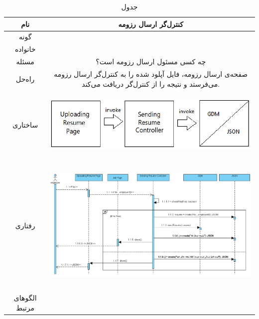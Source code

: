 \begin{table}[H]
	\begin{adjustbox}{width=\textwidth}
		\begin{tabular}{|c|c|}
			\hline
			نام &
			کنترل‌گر ارسال رزومه\\ 
			\hline
			گونه & 
			\grasp \\
			\hline
			خانواده &
			\controller \\
			\hline
			مسئله & 
			چه کسی مسئول ارسال رزومه است؟\\
			\hline
			راه‌حل& 
			صفحه‌ی ارسال رزومه، فایل آپلود شده را به کنترل‌گر ارسال رزومه می‌فرستد و نتیجه‌ را از کنترل‌گر دریافت می‌کند. \\
			\hline
			ساختاری & 
			\begin{minipage}{\textwidth}
				\begin{flushleft}
					\begin{minipage}{\textwidth}
						\includegraphics[width=13cm, height=2.7cm]{./images/7-6-1}
					\end{minipage}
				\end{flushleft}
			\end{minipage}
			
			\\
			\hline
			رفتاری & 
			\begin{minipage}{\textwidth}
				\begin{flushleft}
					\begin{minipage}{\textwidth}
						\includegraphics[width=13.5cm, height=6cm]{./images/7-6-2}
					\end{minipage}
				\end{flushleft}
			\end{minipage}
			\\
			\hline
			الگو‌های مرتبط& \\
			\hline
		\end{tabular}
	\end{adjustbox}
	\caption{جدول }
	\label{table-with-pic:6}
\end{table}

